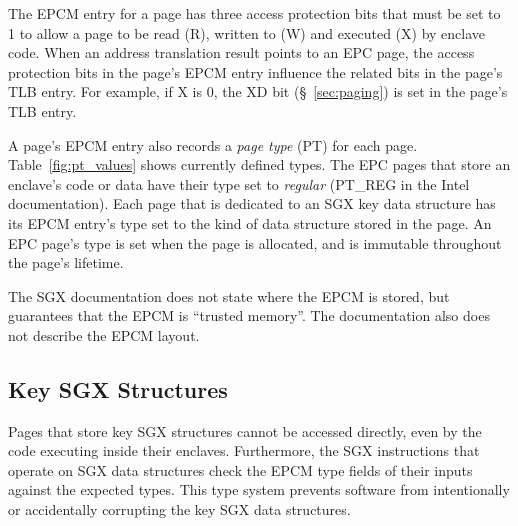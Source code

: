The EPCM entry for a page has three access protection bits that must be set to
1 to allow a page to be read (R), written to (W) and executed (X) by enclave
code. When an address translation result points to an EPC page, the access
protection bits in the page's EPCM entry influence the related bits in the
page's TLB entry. For example, if X is 0, the XD bit (\S~\ref{sec:paging}) is
set in the page's TLB entry.

A page's EPCM entry also records a \textit{page type} (PT) for each page.
Table~\ref{fig:pt_values} shows currently defined types. The EPC pages that
store an enclave's code or data have their type set to \textit{regular}
(PT\_REG in the Intel documentation). Each page that is dedicated to an SGX key
data structure has its EPCM entry's type set to the kind of data structure
stored in the page. An EPC page's type is set when the page is allocated, and
is immutable throughout the page's lifetime.

\begin{table}[hbt]
  \caption{Values of the PT (page type) field in an EPCM entry.}
  \label{fig:pt_values}
\end{table}


The SGX documentation does not state where the EPCM is stored, but guarantees
that the EPCM is ``trusted memory''. The documentation also does not describe
the EPCM layout.



\subsection{Key SGX Structures}
\label{sec:key_structures}


Pages that store key SGX structures cannot be accessed directly, even by the
code executing inside their enclaves. Furthermore, the SGX instructions that
operate on SGX data structures check the EPCM type fields of their inputs
against the expected types. This type system prevents software from
intentionally or accidentally corrupting the key SGX data structures.

